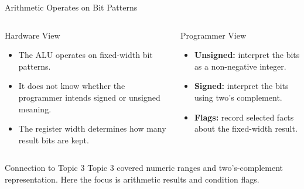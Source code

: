 \documentclass[aspectratio=169,11pt,t]{beamer}
\newcommand{\key}[1]{\textbf{#1}}
\begin{document}
\begin{frame}{Arithmetic Operates on Bit Patterns}

\begin{columns}[T,onlytextwidth]

\begin{block}{Hardware View}
\begin{itemize}
  \item The ALU operates on fixed-width bit patterns.
  \item It does not know whether the programmer intends signed or unsigned meaning.
  \item The register width determines how many result bits are kept.
\end{itemize}
\end{block}

\begin{block}{Programmer View}
\begin{itemize}
  \item \key{Unsigned:} interpret the bits as a non-negative integer.
  \item \key{Signed:} interpret the bits using two's complement.
  \item \key{Flags:} record selected facts about the fixed-width result.
\end{itemize}
\end{block}

\end{columns}

\vspace{0.2cm}

\begin{block}{Connection to Topic 3}
Topic 3 covered numeric ranges and two's-complement representation. Here the focus is arithmetic results and condition flags.
\end{block}

\end{frame}









\end{document}
